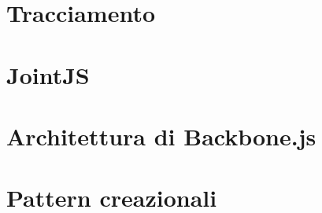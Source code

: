 % 

\section{Tracciamento}




\appendix

\section{JointJS} \label{sec:app_jointjs}


\section{Architettura di Backbone.js}


\section{Pattern creazionali}



